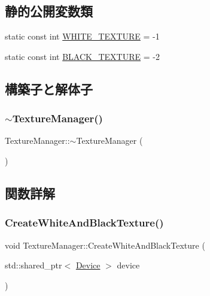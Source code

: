 \subsection*{静的公開変数類}
\begin{DoxyCompactItemize}
\item 
static const int \mbox{\hyperlink{class_texture_manager_a3fb17a5c43751276c5071cf6212b740c}{W\+H\+I\+T\+E\+\_\+\+T\+E\+X\+T\+U\+RE}} = -\/1
\item 
static const int \mbox{\hyperlink{class_texture_manager_ab31a360ffca7a7a9115361580fc2e558}{B\+L\+A\+C\+K\+\_\+\+T\+E\+X\+T\+U\+RE}} = -\/2
\end{DoxyCompactItemize}


\subsection{構築子と解体子}
\mbox{\label{class_texture_manager_a001d6d74674961db79987e3222682576}} 
\subsubsection{\texorpdfstring{$\sim$\+Texture\+Manager()}{~TextureManager()}}
{\footnotesize\ttfamily Texture\+Manager\+::$\sim$\+Texture\+Manager (\begin{DoxyParamCaption}{ }\end{DoxyParamCaption})}



\subsection{関数詳解}
\mbox{\label{class_texture_manager_a3266462ce0ac2bd4e6bad6977df92143}} 
\subsubsection{\texorpdfstring{Create\+White\+And\+Black\+Texture()}{CreateWhiteAndBlackTexture()}}
{\footnotesize\ttfamily void Texture\+Manager\+::\+Create\+White\+And\+Black\+Texture (\begin{DoxyParamCaption}\item[{std\+::shared\+\_\+ptr$<$ \mbox{\hyperlink{class_device}{Device}} $>$}]{device }\end{DoxyParamCaption})}



